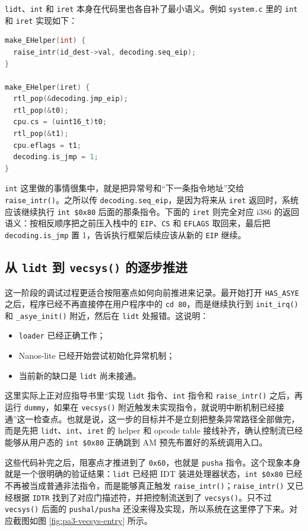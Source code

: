 \documentclass[a4paper]{article}
\begin{document}
\texttt{lidt}、\texttt{int} 和 \texttt{iret} 本身在代码里也各自补了最小语义。例如 \texttt{system.c} 里的 \texttt{int} 和 \texttt{iret} 实现如下：
\begin{lstlisting}[language=C]
make_EHelper(int) {
  raise_intr(id_dest->val, decoding.seq_eip);
}

make_EHelper(iret) {
  rtl_pop(&decoding.jmp_eip);
  rtl_pop(&t0);
  cpu.cs = (uint16_t)t0;
  rtl_pop(&t1);
  cpu.eflags = t1;
  decoding.is_jmp = 1;
}
\end{lstlisting}

\texttt{int} 这里做的事情很集中，就是把异常号和“下一条指令地址”交给 \texttt{raise\_intr()}。之所以传 \texttt{decoding.seq\_eip}，是因为将来从 \texttt{iret} 返回时，系统应该继续执行 \texttt{int \$0x80} 后面的那条指令。下面的 \texttt{iret} 则完全对应 i386 的返回语义：按相反顺序把之前压入栈中的 \texttt{EIP}、\texttt{CS} 和 \texttt{EFLAGS} 取回来，最后把 \texttt{decoding.is\_jmp} 置 1，告诉执行框架后续应该从新的 \texttt{EIP} 继续。

\subsection{从 \texttt{lidt} 到 \texttt{vecsys()} 的逐步推进}
这一阶段的调试过程更适合按阻塞点如何向前推进来记录。最开始打开 \texttt{HAS\_ASYE} 之后，程序已经不再直接停在用户程序中的 \texttt{cd 80}，而是继续执行到 \texttt{init\_irq()} 和 \texttt{\_asye\_init()} 附近，然后在 \texttt{lidt} 处报错。这说明：
\begin{itemize}
  \item \texttt{loader} 已经正确工作；
  \item Nanos-lite 已经开始尝试初始化异常机制；
  \item 当前新的缺口是 \texttt{lidt} 尚未接通。
\end{itemize}

这里实际上正对应指导书里“实现 \texttt{lidt} 指令、\texttt{int} 指令和 \texttt{raise\_intr()} 之后，再运行 \texttt{dummy}，如果在 \texttt{vecsys()} 附近触发未实现指令，就说明中断机制已经接通”这一检查点。也就是说，这一步的目标并不是立刻把整条异常路径全部做完，而是先把 \texttt{lidt}、\texttt{int}、\texttt{iret} 的 helper 和 opcode table 接线补齐，确认控制流已经能够从用户态的 \texttt{int \$0x80} 正确跳到 AM 预先布置好的系统调用入口。

这些代码补完之后，阻塞点才推进到了 \texttt{0x60}，也就是 \texttt{pusha} 指令。这个现象本身就是一个很明确的验证结果：\texttt{lidt} 已经把 IDT 装进处理器状态，\texttt{int \$0x80} 已经不再被当成普通非法指令，而是能够真正触发 \texttt{raise\_intr()}；\texttt{raise\_intr()} 又已经根据 \texttt{IDTR} 找到了对应门描述符，并把控制流送到了 \texttt{vecsys()}。只不过 \texttt{vecsys()} 后面的 \texttt{pushal/pusha} 还没来得及实现，所以系统在这里停了下来。对应截图如图 \ref{fig:pa3-vecsys-entry} 所示。
\end{document}
